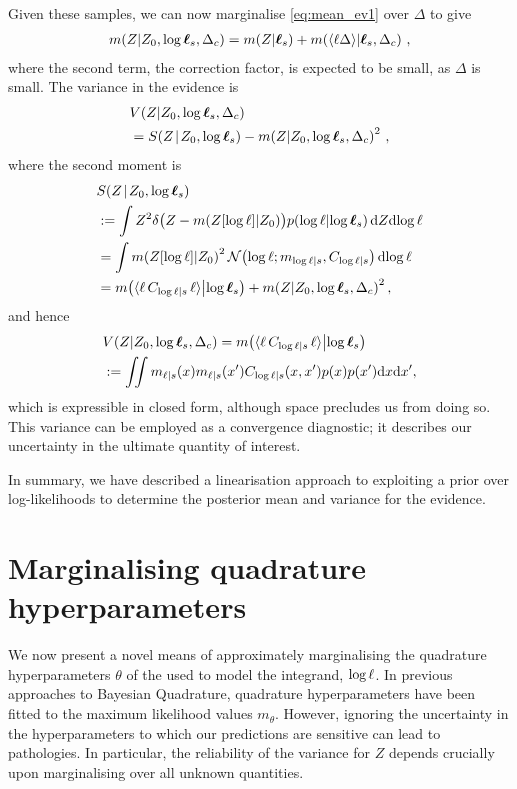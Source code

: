 \documentclass{article}
\begin{document}
Given these samples, we can now marginalise \eqref{eq:mean_ev1} over $\Delta$ to give
\begin{align*}
 \mean{\If}{Z_0,\tvr_s,\Delta_c} =
\mean{\If}{\vr_s} + \mean{\inty{\lfn \Delta}}{\vr_s, \Delta_c}\,,
\end{align*}
where the second term, the correction factor, is expected to be small, as $\Delta$ is small. The variance in the evidence is
\begin{align*}
& \cov{\If}{Z_0,\tvr_s,\Delta_c}\\ 
& = \secm{\If}{Z_0,\tvr_s} - \mean{\If}{Z_0,\tvr_s,\Delta_c}^2\,,
\end{align*}
where the second moment is 
\begin{align*}
& \secm{\If}{Z_0,\tvr_s}  \\
& \deq \int Z^2 
\delta\bigl(Z - \mean{Z[\tr]}{Z_0}\bigr)
\p{\tr}{\tvr_s}
\ud Z \ud\tr\\
& = \int \mean{Z[\tr]}{Z_0}^2
\N{\tr}{\meancondfn{\tr}{s}}{C_{\tr|s}}
 \ud\tr\\
& = \mean{\inty{\lfn\,C_{\tr|s}\,\lfn}}{\tvr_s}+
\mean{\If}{Z_0,\tvr_s,\Delta_c}^2,
\end{align*}
and hence 
\begin{align*}
  &\cov{\If}{Z_0,\tvr_s,\Delta_c} = \mean{\inty{\lfn\,C_{\tr|s}\,\lfn}}{\tvr_s} \\ 
& \deq
 \iint m_{\lfn|s}(\lfv) m_{\lfn|s}(\lfv') C_{\tr|s}(\lfv,\lfv')  p(x) p(x') \ud \lfv \ud\lfv',
\end{align*}
which is expressible in closed form, although space precludes us from doing so. This variance can be employed as a convergence diagnostic; it describes our uncertainty in the ultimate quantity of interest.

In summary, we have described a linearisation approach to exploiting a  prior over log-likelihoods to determine the posterior mean and variance for the evidence. 

\section{Marginalising quadrature hyperparameters}
\label{sec:marginalization}

We now present a novel means of approximately marginalising the quadrature hyperparameters $\theta$ of the \gpb used to model the integrand, $\tr$. In previous approaches to Bayesian Quadrature, quadrature hyperparameters have been fitted to the
 maximum likelihood values $m_\theta$. However, ignoring the uncertainty in the hyperparameters to which our predictions are sensitive can lead to pathologies. In particular, the reliability of the variance for $Z$ depends crucially upon marginalising over all unknown quantities. 
\end{document}
